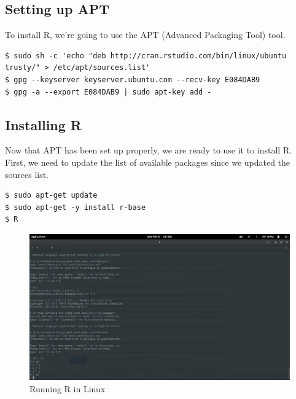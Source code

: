 
\subsection{Setting up APT}

To install R, we're going to use the APT (Advanced Packaging Tool) tool. \newline

\begin{lstlisting}
$ sudo sh -c 'echo "deb http://cran.rstudio.com/bin/linux/ubuntu trusty/" > /etc/apt/sources.list' 
$ gpg --keyserver keyserver.ubuntu.com --recv-key E084DAB9
$ gpg -a --export E084DAB9 | sudo apt-key add -
\end{lstlisting}

\subsection{Installing R}

Now that APT has been set up properly, we are ready to use it to install R. \newline
First, we need to update the list of available packages since we updated the sources list. \newline

\begin{lstlisting}
$ sudo apt-get update
$ sudo apt-get -y install r-base
$ R
\end{lstlisting}

\begin{figure}[h!]
\includegraphics[scale=0.25]{r_window.png}
  \centering
  \caption{Running R in Linux}
  \label{fig:barchart1}
\end{figure}

